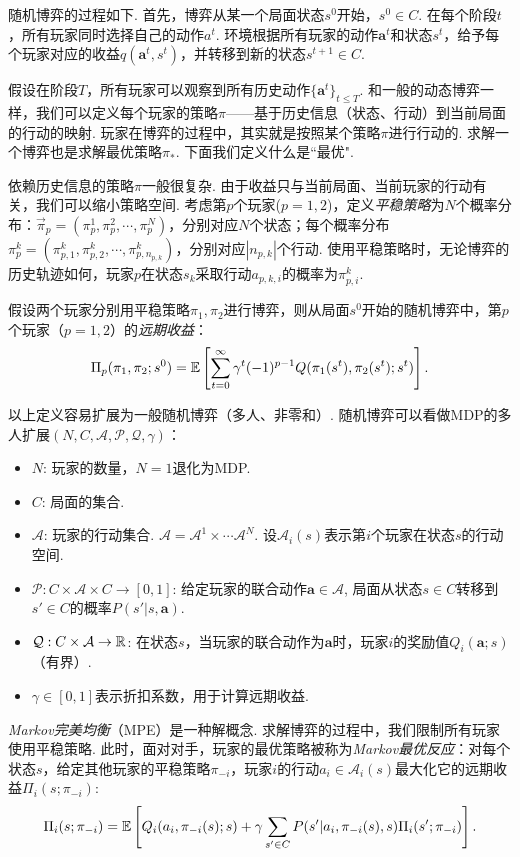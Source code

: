 随机博弈的过程如下. 首先，博弈从某一个局面状态$s^0$开始，$s^0\in C$. 在每个阶段$t$，所有玩家同时选择自己的动作$a^t$. 环境根据所有玩家的动作$\boldsymbol a^t$和状态$s^t$，给予每个玩家对应的收益$q(\boldsymbol a^t, s^t)$，并转移到新的状态$s^{t+1}\in C$. 

假设在阶段$T$，所有玩家可以观察到所有历史动作$\{\boldsymbol a^t\}_{t\le T}$. 和一般的动态博弈一样，我们可以定义每个玩家的策略$\pi$——基于历史信息（状态、行动）到当前局面的行动的映射. 玩家在博弈的过程中，其实就是按照某个策略$\pi$进行行动的. 求解一个博弈也是求解最优策略$\pi_*$. 下面我们定义什么是``最优".

依赖历史信息的策略$\pi$一般很复杂. 由于收益只与当前局面、当前玩家的行动有关，我们可以缩小策略空间. 考虑第$p$个玩家($p=1,2$)，定义\emph{平稳策略}为$N$个概率分布：$\vec \pi_p=(\pi_p^1,\pi_p^2,\cdots,\pi_p^N)$，分别对应$N$个状态；每个概率分布$\pi_p^k=(\pi_{p,1}^k,\pi_{p,2}^k,\cdots,\pi_{p,n_{p,k}}^k)$，分别对应$|n_{p,k}|$个行动. 使用平稳策略时，无论博弈的历史轨迹如何，玩家$p$在状态$s_k$采取行动$a_{p,k,i}$的概率为$\pi_{p,i}^k$.

假设两个玩家分别用平稳策略$\pi_1,\pi_2$进行博弈，则从局面$s^0$开始的随机博弈中，第$p$个玩家（$p=1,2$）的\emph{远期收益}：
        \[\Pi_p(\pi_1,\pi_2; s^0) = \mathbb{E}\left[\sum_{t=0}^\infty \gamma^t(-1)^{p-1} Q(\pi_1(s^t),\pi_2(s^t); {s^t}) \right].\]

以上定义容易扩展为一般随机博弈（多人、非零和）. 随机博弈可以看做MDP的多人扩展$(N, C, \mathcal A, \mathcal P,\mathcal Q, \gamma)$：
\begin{itemize}
    \item $N$: 玩家的数量，$N=1$退化为MDP.
    \item $C$: 局面的集合.
    \item $\mathcal A$: 玩家的行动集合. $\mathcal A=\mathcal A^1\times \cdots\mathcal A^N$. 设$\mathcal A_i(s)$表示第$i$个玩家在状态$s$的行动空间.
    \item $\mathcal P: C\times \mathcal A\times C\to [0,1]$: 给定玩家的联合动作$\boldsymbol a\in\mathcal A$, 局面从状态$s\in C$转移到$s'\in C$的概率$P(s'|s,\boldsymbol a)$.
    \item $\mathcal Q: C\times \mathcal A\to \mathbb{R}$: 在状态$s$，当玩家的联合动作为$\boldsymbol a$时，玩家$i$的奖励值$Q_i(\boldsymbol a;s)$（有界）. 
    \item $\gamma\in[0,1]$表示折扣系数，用于计算远期收益.
\end{itemize}

\emph{Markov完美均衡}（MPE）是一种解概念. 求解博弈的过程中，我们限制所有玩家使用平稳策略. 此时，面对对手，玩家的最优策略被称为\emph{Markov最优反应}：对每个状态$s$，给定其他玩家的平稳策略$\pi_{-i}$，玩家$i$的行动$a_i\in \mathcal A_i(s)$最大化它的远期收益$\Pi_i(s;\pi_{-i})$:
    \[\Pi_i(s;\pi_{-i}) = \mathbb{E}\left[Q_i(a_i,\pi_{-i}(s);s) + \gamma\sum_{s'\in C} P(s'|a_i,\pi_{-i}(s),s)\Pi_i(s';\pi_{-i}) \right].\]

